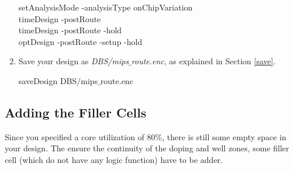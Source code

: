 \begin{enumerate}
\begin{codeline}
setAnalysisMode -analysisType onChipVariation \\
timeDesign -postRoute \\
timeDesign -postRoute -hold \\
optDesign -postRoute -setup -hold
\end{codeline}



\item Save your design as \textit{DBS/mips$\_$route.enc}, as explained in Section \ref{save}. 
\begin{codeline}
	saveDesign DBS/mips$\_$route.enc
\end{codeline}

\end{enumerate}


\clearpage
\subsection{Adding the Filler Cells}
Since you specified a core utilization of 80$\%$, there is still some empty space in your design. The ensure the continuity of the doping and well zones, some filler cell (which do not have any logic function) have to be adder.


